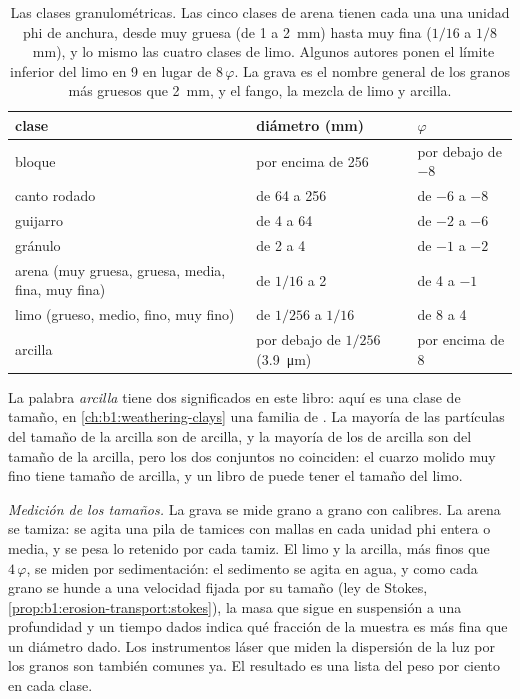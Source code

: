 \begin{table}[htbp]
\centering\small
\begin{tabular}{@{}lll@{}}
\hline
clase & diámetro (\si{mm}) & $\varphi$ \\
\hline
bloque & por encima de 256 & por debajo de $-8$ \\
canto rodado & de 64 a 256 & de $-6$ a $-8$ \\
guijarro & de 4 a 64 & de $-2$ a $-6$ \\
gránulo & de 2 a 4 & de $-1$ a $-2$ \\
arena (muy gruesa, gruesa, media, fina, muy fina) & de $1/16$ a 2 & de 4 a $-1$ \\
limo (grueso, medio, fino, muy fino) & de $1/256$ a $1/16$ & de 8 a 4 \\
arcilla & por debajo de $1/256$ (\qty{3.9}{\micro m}) & por encima de 8 \\
\hline
\end{tabular}
\caption{Las clases granulométricas. Las cinco clases de arena tienen cada una una unidad phi de anchura, desde muy gruesa (de 1 a \qty{2}{mm}) hasta muy
fina ($1/16$ a $1/8$~mm), y lo mismo las cuatro clases de limo. Algunos autores ponen el límite inferior del limo en 9 en lugar de $8\,\varphi$. La grava es el
nombre general de los granos más gruesos que \qty{2}{mm}, y el fango, la mezcla de limo y arcilla.}
\label{tab:b1:clastic-sediments:classes}
\end{table}

La palabra \emph{arcilla} tiene dos significados en este libro: aquí es una clase de tamaño, en \cref{ch:b1:weathering-clays} una familia de . La
mayoría de las partículas del tamaño de la arcilla son  de arcilla, y la mayoría de los  de arcilla son del tamaño de la arcilla, pero los
dos conjuntos no coinciden: el cuarzo molido muy fino tiene tamaño de arcilla, y un libro de  puede tener el tamaño del limo.

\emph{Medición de los tamaños.} La grava se mide grano a grano con calibres. La arena se tamiza: se agita una pila de tamices con mallas en cada unidad
phi entera o media, y se pesa lo retenido por cada tamiz. El limo y la arcilla, más finos que $4\,\varphi$, se miden por sedimentación: el sedimento se agita en agua,
y como cada grano se hunde a una velocidad fijada por su tamaño (ley de Stokes, \cref{prop:b1:erosion-transport:stokes}), la masa que sigue en suspensión a una
profundidad y un tiempo dados indica qué fracción de la muestra es más fina que un diámetro dado. Los instrumentos láser que miden la dispersión de la luz por los
granos son también comunes ya. El resultado es una lista del peso por ciento en cada clase.

